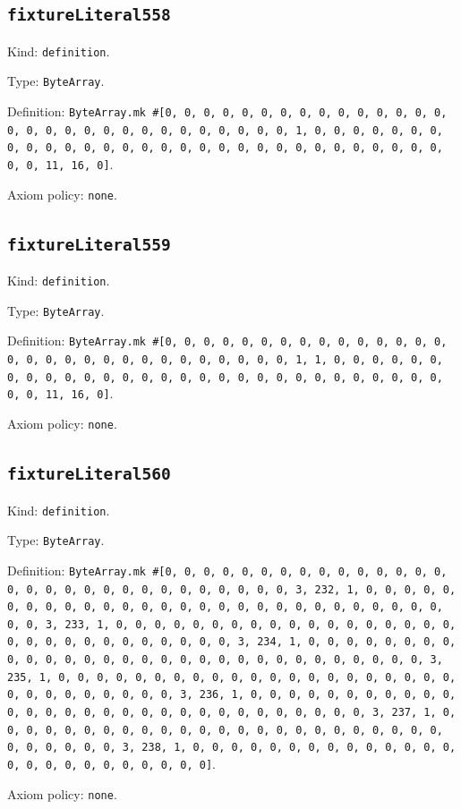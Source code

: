 \documentclass[11pt]{article}
\begin{document}
\subsection*{\texttt{fixtureLiteral558}}
\noindent Kind: \texttt{definition}.\par
\noindent Type: \texttt{ByteArray}.\par
\noindent Definition: \texttt{ByteArray.mk \#[0, 0, 0, 0, 0, 0, 0, 0, 0, 0, 0, 0, 0, 0, 0, 0, 0, 0, 0, 0, 0, 0, 0, 0, 0, 0, 0, 0, 0, 0, 1, 0, 0, 0, 0, 0, 0, 0, 0, 0, 0, 0, 0, 0, 0, 0, 0, 0, 0, 0, 0, 0, 0, 0, 0, 0, 0, 0, 0, 0, 0, 0, 0, 11, 16, 0]}.\par
\noindent Axiom policy: \texttt{none}.\par
\subsection*{\texttt{fixtureLiteral559}}
\noindent Kind: \texttt{definition}.\par
\noindent Type: \texttt{ByteArray}.\par
\noindent Definition: \texttt{ByteArray.mk \#[0, 0, 0, 0, 0, 0, 0, 0, 0, 0, 0, 0, 0, 0, 0, 0, 0, 0, 0, 0, 0, 0, 0, 0, 0, 0, 0, 0, 0, 0, 1, 1, 0, 0, 0, 0, 0, 0, 0, 0, 0, 0, 0, 0, 0, 0, 0, 0, 0, 0, 0, 0, 0, 0, 0, 0, 0, 0, 0, 0, 0, 0, 0, 11, 16, 0]}.\par
\noindent Axiom policy: \texttt{none}.\par
\subsection*{\texttt{fixtureLiteral560}}
\noindent Kind: \texttt{definition}.\par
\noindent Type: \texttt{ByteArray}.\par
\noindent Definition: \texttt{ByteArray.mk \#[0, 0, 0, 0, 0, 0, 0, 0, 0, 0, 0, 0, 0, 0, 0, 0, 0, 0, 0, 0, 0, 0, 0, 0, 0, 0, 0, 0, 0, 0, 3, 232, 1, 0, 0, 0, 0, 0, 0, 0, 0, 0, 0, 0, 0, 0, 0, 0, 0, 0, 0, 0, 0, 0, 0, 0, 0, 0, 0, 0, 0, 0, 0, 3, 233, 1, 0, 0, 0, 0, 0, 0, 0, 0, 0, 0, 0, 0, 0, 0, 0, 0, 0, 0, 0, 0, 0, 0, 0, 0, 0, 0, 0, 0, 0, 0, 3, 234, 1, 0, 0, 0, 0, 0, 0, 0, 0, 0, 0, 0, 0, 0, 0, 0, 0, 0, 0, 0, 0, 0, 0, 0, 0, 0, 0, 0, 0, 0, 0, 3, 235, 1, 0, 0, 0, 0, 0, 0, 0, 0, 0, 0, 0, 0, 0, 0, 0, 0, 0, 0, 0, 0, 0, 0, 0, 0, 0, 0, 0, 0, 0, 0, 3, 236, 1, 0, 0, 0, 0, 0, 0, 0, 0, 0, 0, 0, 0, 0, 0, 0, 0, 0, 0, 0, 0, 0, 0, 0, 0, 0, 0, 0, 0, 0, 0, 3, 237, 1, 0, 0, 0, 0, 0, 0, 0, 0, 0, 0, 0, 0, 0, 0, 0, 0, 0, 0, 0, 0, 0, 0, 0, 0, 0, 0, 0, 0, 0, 0, 3, 238, 1, 0, 0, 0, 0, 0, 0, 0, 0, 0, 0, 0, 0, 0, 0, 0, 0, 0, 0, 0, 0, 0, 0, 0, 0, 0]}.\par
\noindent Axiom policy: \texttt{none}.\par
\end{document}
